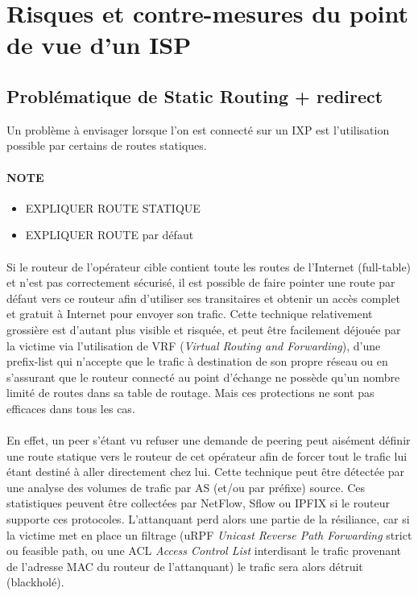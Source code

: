 \section{Risques et contre-mesures du point de vue d'un ISP}

\subsection{Problématique de Static Routing + redirect}
Un problème à envisager lorsque l'on est connecté sur un IXP est l’utilisation possible par certains de routes statiques. 

\paragraph{NOTE}
\begin{itemize}
\item EXPLIQUER ROUTE STATIQUE
\item EXPLIQUER ROUTE par défaut
\end{itemize}

\paragraph{}
Si le routeur de l'opérateur cible contient toute les routes de l'Internet (full-table) et n'est pas correctement sécurisé, il est possible de faire pointer une route par défaut vers ce routeur afin d’utiliser ses transitaires et obtenir un accès complet et gratuit à Internet pour envoyer son trafic. Cette technique relativement grossière est d'autant plus visible et risquée, et peut être facilement déjouée par la victime via l'utilisation de VRF (\emph{Virtual Routing and Forwarding}), d'une prefix-list qui n'accepte que le trafic à destination de son propre réseau ou en s'assurant que le routeur connecté au point d'échange ne possède qu'un nombre limité de routes dans sa table de routage. Mais ces protections ne sont pas efficaces dans tous les cas.

\paragraph{}
En effet, un peer s'étant vu refuser une demande de peering peut aisément définir une route statique vers le routeur de cet opérateur afin de forcer tout le trafic lui étant destiné à aller directement chez lui. Cette technique peut être détectée par une analyse des volumes de trafic par AS (et/ou par préfixe) source. Ces statistiques peuvent être collectées par NetFlow, Sflow ou IPFIX si le routeur supporte ces protocoles. L'attanquant perd alors une partie de la résiliance, car si la victime met en place un filtrage (uRPF \emph{Unicast Reverse Path Forwarding} strict ou feasible path, ou une ACL \emph{Access Control List} interdisant le trafic provenant de l'adresse MAC du routeur de l'attanquant) le trafic sera alors détruit (blackholé).

